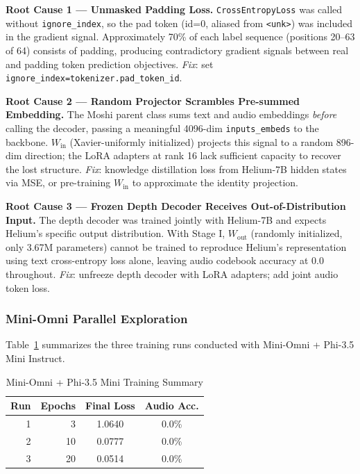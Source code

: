 \documentclass[conference]{IEEEtran}
\begin{document}
\textbf{Root Cause 1 --- Unmasked Padding Loss.}
\texttt{CrossEntropyLoss} was called without \texttt{ignore\_index}, so the
pad token (id=0, aliased from \texttt{<unk>}) was included in the gradient
signal.
Approximately 70\% of each label sequence (positions 20--63 of 64) consists
of padding, producing contradictory gradient signals between real and padding
token prediction objectives.
\emph{Fix}: set \texttt{ignore\_index=tokenizer.pad\_token\_id}.

\textbf{Root Cause 2 --- Random Projector Scrambles Pre-summed Embedding.}
The Moshi parent class sums text and audio embeddings \emph{before} calling the
decoder, passing a meaningful 4096-dim \texttt{inputs\_embeds} to the backbone.
$W_{\text{in}}$ (Xavier-uniformly initialized) projects this signal to a random
896-dim direction; the LoRA adapters at rank 16 lack sufficient capacity to
recover the lost structure.
\emph{Fix}: knowledge distillation loss from Helium-7B hidden states via MSE,
or pre-training $W_{\text{in}}$ to approximate the identity projection.

\textbf{Root Cause 3 --- Frozen Depth Decoder Receives Out-of-Distribution Input.}
The depth decoder was trained jointly with Helium-7B and expects Helium's
specific output distribution.
With Stage I, $W_{\text{out}}$ (randomly initialized, only 3.67M parameters)
cannot be trained to reproduce Helium's representation using text cross-entropy
loss alone, leaving audio codebook accuracy at 0.0 throughout.
\emph{Fix}: unfreeze depth decoder with LoRA adapters; add joint audio token loss.

\subsubsection{Mini-Omni Parallel Exploration}

Table~\ref{tab:miniomni} summarizes the three training runs conducted with
Mini-Omni + Phi-3.5 Mini Instruct.

\begin{table}[t]
\caption{Mini-Omni + Phi-3.5 Mini Training Summary}
\label{tab:miniomni}
\centering
\small
\begin{tabular}{@{}rrcc@{}}
\toprule
\textbf{Run} & \textbf{Epochs} & \textbf{Final Loss} & \textbf{Audio Acc.} \\
\midrule
1 & 3  & 1.0640 & 0.0\% \\
2 & 10 & 0.0777 & 0.0\% \\
3 & 20 & 0.0514 & 0.0\% \\
\bottomrule
\end{tabular}
\end{table}
\end{document}
